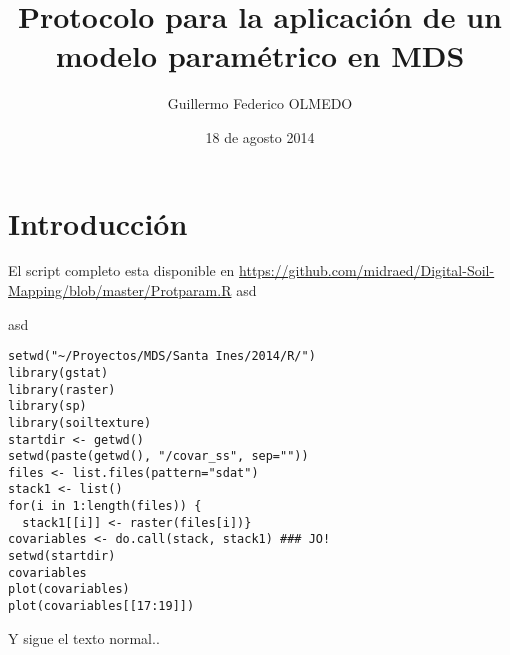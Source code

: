 \documentclass[10pt,a4paper]{article}
\date{18 de agosto 2014}
\title{Protocolo para la aplicación de un modelo paramétrico en MDS}
\author{Guillermo Federico OLMEDO}
\begin{document}
\maketitle
\section{Introducción}
El script completo esta disponible en
\url{https://github.com/midraed/Digital-Soil-Mapping/blob/master/Protparam.R}
asd

asd
\begin{lstlisting}
setwd("~/Proyectos/MDS/Santa Ines/2014/R/")
library(gstat)
library(raster)
library(sp)
library(soiltexture)
startdir <- getwd()
setwd(paste(getwd(), "/covar_ss", sep=""))
files <- list.files(pattern="sdat")
stack1 <- list()
for(i in 1:length(files)) {
  stack1[[i]] <- raster(files[i])}
covariables <- do.call(stack, stack1) ### JO!
setwd(startdir)
covariables
plot(covariables)
plot(covariables[[17:19]])
\end{lstlisting}
Y sigue el texto normal..\citep*{webster_geostatistics_2007}
  

\end{document}
